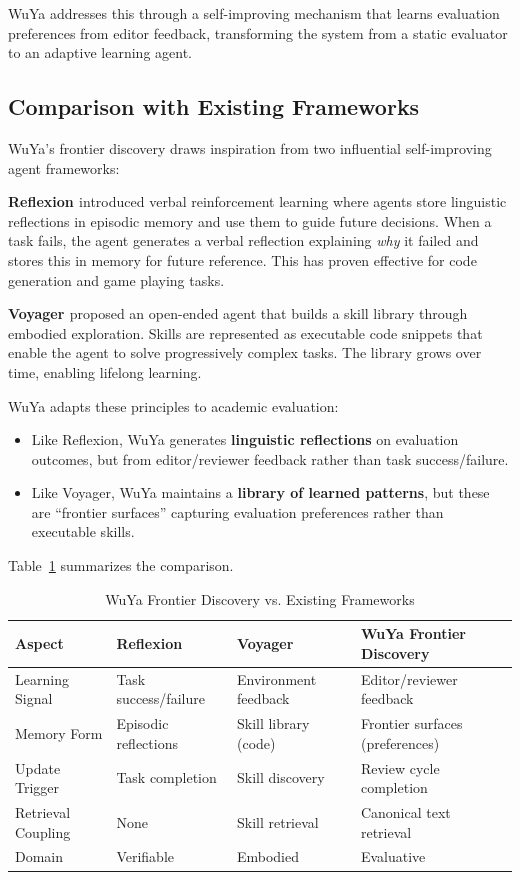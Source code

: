 \documentclass[11pt,a4paper]{article}
\begin{document}
WuYa addresses this through a self-improving mechanism that learns evaluation preferences from editor feedback, transforming the system from a static evaluator to an adaptive learning agent.

\subsection{Comparison with Existing Frameworks}

WuYa's frontier discovery draws inspiration from two influential self-improving agent frameworks:

\textbf{Reflexion \citep{shinn2023reflexion}} introduced verbal reinforcement learning where agents store linguistic reflections in episodic memory and use them to guide future decisions. When a task fails, the agent generates a verbal reflection explaining \textit{why} it failed and stores this in memory for future reference. This has proven effective for code generation and game playing tasks.

\textbf{Voyager \citep{wang2023voyager}} proposed an open-ended agent that builds a skill library through embodied exploration. Skills are represented as executable code snippets that enable the agent to solve progressively complex tasks. The library grows over time, enabling lifelong learning.

WuYa adapts these principles to academic evaluation:

\begin{itemize}
    \item Like Reflexion, WuYa generates \textbf{linguistic reflections} on evaluation outcomes, but from editor/reviewer feedback rather than task success/failure.
    \item Like Voyager, WuYa maintains a \textbf{library of learned patterns}, but these are ``frontier surfaces'' capturing evaluation preferences rather than executable skills.
\end{itemize}

Table~\ref{tab:frontier-comparison} summarizes the comparison.

\begin{table}[t]
\centering
\caption{WuYa Frontier Discovery vs. Existing Frameworks}
\label{tab:frontier-comparison}
\begin{tabular}{@{}llll@{}}
\toprule
\textbf{Aspect} & \textbf{Reflexion} & \textbf{Voyager} & \textbf{WuYa Frontier Discovery} \\
\midrule
Learning Signal & Task success/failure & Environment feedback & Editor/reviewer feedback \\
Memory Form & Episodic reflections & Skill library (code) & Frontier surfaces (preferences) \\
Update Trigger & Task completion & Skill discovery & Review cycle completion \\
Retrieval Coupling & None & Skill retrieval & Canonical text retrieval \\
Domain & Verifiable & Embodied & Evaluative \\
\bottomrule
\end{tabular}
\end{table}
\end{document}
